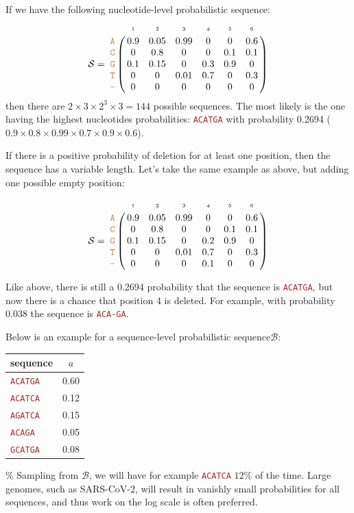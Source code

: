 \documentclass[
]{article}
\newcommand{\sq}[1]{\texttt{\textcolor{brown}{#1}}}
\newcommand{\sps}{\mathcal{B}} %
\newcommand{\nps}{\mathcal{S}} %
\newcommand{\nlps}{nucleotide-level probabilistic sequence\xspace}
\newcommand{\slps}{sequence-level probabilistic sequence\xspace}
\begin{document}
If we have the following \nlps: \[
\nps = 
\bordermatrix{
& \scriptscriptstyle{1} & \scriptscriptstyle{2}& \scriptscriptstyle{3}& \scriptscriptstyle{4} & \scriptscriptstyle{5} & \scriptscriptstyle{6} \cr
\sq{A} & 0.9 & 0.05   & 0.99 & 0 & 0 & 0.6\cr
\sq{C} & 0   & 0.8 & 0 & 0 & 0.1 & 0.1\cr
\sq{G} & 0.1 & 0.15 & 0 & 0.3 & 0.9 & 0\cr
\sq{T} & 0 & 0 & 0.01 & 0.7 & 0 & 0.3\cr
\sq{-} & 0 & 0 & 0 & 0 & 0 & 0\cr
}
\] then there are \(2\times 3 \times 2^3 \times 3 = 144\) possible
sequences. The most likely is the one having the highest nucleotides
probabilities: \sq{ACATGA} with probability 0.2694
(\(0.9\times 0.8\times 0.99 \times 0.7 \times 0.9 \times 0.6\)).

If there is a positive probability of deletion for at least one
position, then the sequence has a variable length. Let's take the same
example as above, but adding one possible empty position:

\[
\nps = 
\bordermatrix{
&\scriptscriptstyle{1} & \scriptscriptstyle{2}& \scriptscriptstyle{3}& \scriptscriptstyle{4} & \scriptscriptstyle{5} & \scriptscriptstyle{6} \cr
\sq{A} & 0.9 & 0.05   & 0.99 & 0 & 0 & 0.6\cr
\sq{C} & 0   & 0.8 & 0 & 0 & 0.1 & 0.1\cr
\sq{G} & 0.1 & 0.15 & 0 & 0.2 & 0.9 & 0\cr
\sq{T} & 0 & 0 & 0.01 & 0.7 & 0 & 0.3\cr
\sq{-} & 0 & 0 & 0 & 0.1 & 0 & 0\cr
}
\]

\noindent Like above, there is still a 0.2694 probability that the
sequence is \sq{ACATGA}, but now there is a chance that position 4 is
deleted. For example, with probability 0.038 the sequence is
\sq{ACA-GA}.

Below is an example for a \slps \(\sps\):

\begin{table}[H]
\begin{center}
\begin{tabular}{lc}
\hline
\textbf{sequence} & $a$ \\
\hline
\sq{ACATGA} & 0.60 \\
\sq{ACATCA} & 0.12 \\
\sq{AGATCA} & 0.15 \\
\sq{ACAGA}  & 0.05 \\
\sq{GCATGA} & 0.08 \\
\hline
\end{tabular}
\end{center}
\label{default}
\end{table}

\% Sampling from \(\sps\), we will have for example \sq{ACATCA} \(12\%\)
of the time. Large genomes, such as SARS-CoV-2, will result in vanishly
small probabilities for all sequences, and thus work on the log scale is
often preferred.
\end{document}
